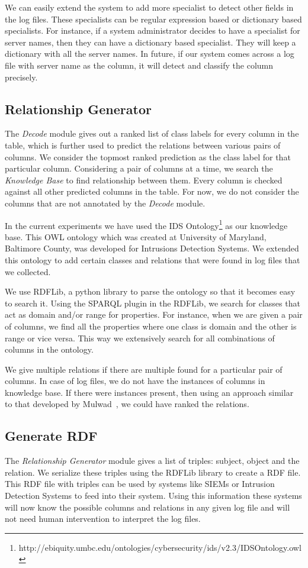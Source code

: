 We can easily extend the system to add more specialist to detect other fields in the log files. These specialists can be regular expression based or dictionary based specialists. For instance, if a system administrator decides to have a specialist for server names, then they can have a dictionary based specialist. They will keep a dictionary with all the server names. In future, if  our system comes across a log file with server name as the column, it will detect and classify the column precisely.
 

\subsection{Relationship Generator}
\label{Relationship Generator}

The \textit{Decode} module gives out a ranked list of class labels for every column in the table, which is further used to predict the relations between various pairs of columns. We consider the topmost ranked prediction as the class label for that particular column. Considering a pair of columns at a time, we search the \textit{Knowledge Base} to find relationship between them. Every column is checked against all other predicted columns in the table. For now, we do not consider the columns that are not annotated by the \textit{Decode} module.

In the current experiments we have used the IDS Ontology\footnote{http://ebiquity.umbc.edu/ontologies/cybersecurity/ids/v2.3/IDSOntology.owl} as our knowledge base. This OWL ontology which was created at University of Maryland, Baltimore County, was developed for Intrusions Detection Systems. We extended this ontology to add certain classes and relations that were found in log files that we collected.

We use RDFLib, a python library to parse the ontology so that it becomes easy to search it. Using the SPARQL plugin in the RDFLib, we search for classes that act as domain and/or range for properties. For instance, when we are given a pair of columns, we find all the properties where one class is domain and the other is range or vice versa. This way we extensively search for all combinations of columns in the ontology.

We give multiple relations if there are multiple found for a particular pair of columns. In case of log files, we do not have the instances of columns in knowledge base. If there were instances present, then using an approach similar to that developed by Mulwad~\cite{mulwad2015tabel}, we could have ranked the relations.  


\subsection{Generate RDF}
\label{Generate RDF}

The \textit{Relationship Generator} module gives a list of triples: subject, object and the relation. We serialize these triples using the RDFLib library to create a RDF file. This RDF file with triples can be used by systems like SIEMs or Intrusion Detection Systems to feed into their system. Using this information these systems will now know the possible columns and relations in any given log file and will not need human intervention to interpret the log files.
